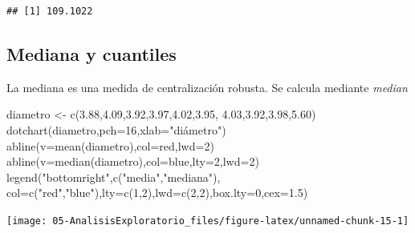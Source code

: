 \documentclass[
]{book}
\newenvironment{Shaded}{\begin{snugshade}}{\end{snugshade}}
\newcommand{\AttributeTok}[1]{\textcolor[rgb]{0.77,0.63,0.00}{#1}}
\newcommand{\DecValTok}[1]{\textcolor[rgb]{0.00,0.00,0.81}{#1}}
\newcommand{\FloatTok}[1]{\textcolor[rgb]{0.00,0.00,0.81}{#1}}
\newcommand{\FunctionTok}[1]{\textcolor[rgb]{0.00,0.00,0.00}{#1}}
\newcommand{\NormalTok}[1]{#1}
\newcommand{\OtherTok}[1]{\textcolor[rgb]{0.56,0.35,0.01}{#1}}
\newcommand{\StringTok}[1]{\textcolor[rgb]{0.31,0.60,0.02}{#1}}
\theoremstyle{break}
\theoremstyle{nonumberplain}
\begin{document}
\begin{verbatim}
## [1] 109.1022
\end{verbatim}

\hypertarget{mediana-y-cuantiles}{%
\subsection{Mediana y cuantiles}\label{mediana-y-cuantiles}}

La mediana es una medida de centralización robusta. Se calcula mediante \emph{median}

\begin{Shaded}
\begin{Highlighting}[]
\NormalTok{diametro }\OtherTok{\textless{}{-}} \FunctionTok{c}\NormalTok{(}\FloatTok{3.88}\NormalTok{,}\FloatTok{4.09}\NormalTok{,}\FloatTok{3.92}\NormalTok{,}\FloatTok{3.97}\NormalTok{,}\FloatTok{4.02}\NormalTok{,}\FloatTok{3.95}\NormalTok{, }\FloatTok{4.03}\NormalTok{,}\FloatTok{3.92}\NormalTok{,}\FloatTok{3.98}\NormalTok{,}\FloatTok{5.60}\NormalTok{)}
\FunctionTok{dotchart}\NormalTok{(diametro,}\AttributeTok{pch=}\DecValTok{16}\NormalTok{,}\AttributeTok{xlab=}\StringTok{"diámetro"}\NormalTok{)}
\FunctionTok{abline}\NormalTok{(}\AttributeTok{v=}\FunctionTok{mean}\NormalTok{(diametro),}\AttributeTok{col=}\StringTok{\textquotesingle{}red\textquotesingle{}}\NormalTok{,}\AttributeTok{lwd=}\DecValTok{2}\NormalTok{)}
\FunctionTok{abline}\NormalTok{(}\AttributeTok{v=}\FunctionTok{median}\NormalTok{(diametro),}\AttributeTok{col=}\StringTok{\textquotesingle{}blue\textquotesingle{}}\NormalTok{,}\AttributeTok{lty=}\DecValTok{2}\NormalTok{,}\AttributeTok{lwd=}\DecValTok{2}\NormalTok{)}
\FunctionTok{legend}\NormalTok{(}\StringTok{"bottomright"}\NormalTok{,}\FunctionTok{c}\NormalTok{(}\StringTok{"media"}\NormalTok{,}\StringTok{"mediana"}\NormalTok{),}
       \AttributeTok{col=}\FunctionTok{c}\NormalTok{(}\StringTok{"red"}\NormalTok{,}\StringTok{"blue"}\NormalTok{),}\AttributeTok{lty=}\FunctionTok{c}\NormalTok{(}\DecValTok{1}\NormalTok{,}\DecValTok{2}\NormalTok{),}\AttributeTok{lwd=}\FunctionTok{c}\NormalTok{(}\DecValTok{2}\NormalTok{,}\DecValTok{2}\NormalTok{),}\AttributeTok{box.lty=}\DecValTok{0}\NormalTok{,}\AttributeTok{cex=}\FloatTok{1.5}\NormalTok{)}
\end{Highlighting}
\end{Shaded}

\begin{center}\texttt{[image: 05-AnalisisExploratorio\_files/figure-latex/unnamed-chunk-15-1]} \end{center}
\end{document}
